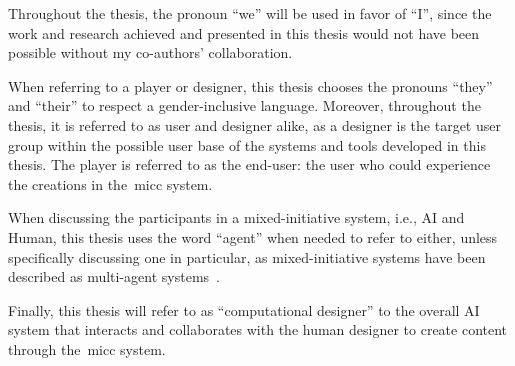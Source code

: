 Throughout the thesis, the pronoun ``we'' will be used in favor of ``I'', since the work and research achieved and presented in this thesis would not have been possible without my co-authors' collaboration. 

\sloppy
When referring to a player or designer, this thesis chooses the pronouns ``they'' and ``their'' to respect a gender-inclusive language. Moreover, throughout the thesis, it is referred to as user and designer alike, as a designer is the target user group within the possible user base of the systems and tools developed in this thesis. The player is referred to as the end-user: the user who could experience the creations in the~\acrlong{micc} system.


When discussing the participants in a mixed-initiative system, i.e., AI and Human, this thesis uses the word ``agent'' when needed to refer to either, unless specifically discussing one in particular, as mixed-initiative systems have been described as multi-agent systems~\cite{allen_mixed-initiative_1999}.

Finally, this thesis will refer to as ``computational designer'' to the overall AI system that interacts and collaborates with the human designer to create content through the~\acrshort{micc} system.




